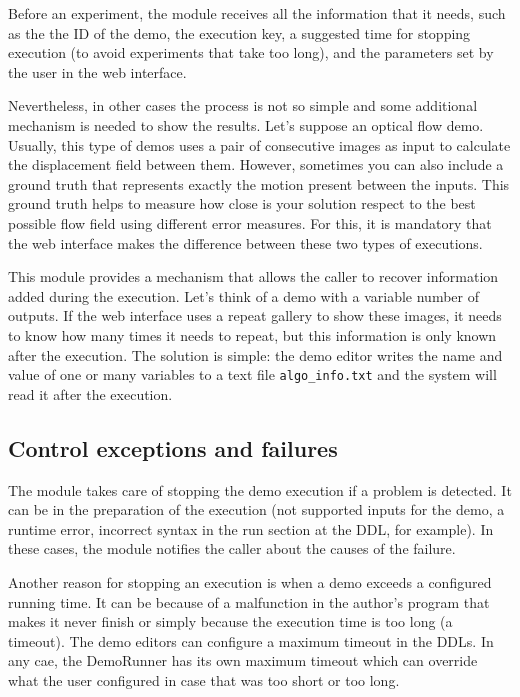 Before an experiment, the module receives all the information that it needs, such as the the ID of the demo, the execution key, a suggested time for stopping execution (to avoid experiments that take too long), and the parameters set by the user in the web interface.

Nevertheless, in other cases the process is not so simple and some additional mechanism is needed to show the results.  Let's suppose an optical flow demo. Usually, this type of demos uses a pair of consecutive images as input to calculate the displacement field between them. However, sometimes you can also include a ground truth that represents exactly the motion present between the inputs. This ground truth helps to measure how close is your solution respect to the best possible flow field using different error measures. For this, it is mandatory that the web interface makes the difference between these two types of executions. 


This module provides a mechanism that allows the caller to recover information added during the execution. Let's think of a demo with a variable number of outputs. If the web interface uses a repeat gallery to show these images, it needs to know how many times it needs to repeat, but this information is only known after the execution. The solution is simple: the demo editor writes the name and value of one or many variables to a text file {\tt algo\_info.txt} and the system will read it after the execution.


\subsection{Control exceptions and failures}
\noindent

The module takes care of stopping the demo execution if a problem is detected. It can be in the preparation of the execution (not supported inputs for the demo, a runtime error, incorrect syntax in the run section at the DDL, for example). In these cases, the module notifies the caller about the causes of the failure.

Another reason for stopping an execution is when a demo exceeds a configured running time. It can be because of a malfunction in the author's program that makes it never finish or simply because the execution time is too long (a timeout). The demo editors can configure a maximum timeout in the DDLs. In any cae, the DemoRunner has its own maximum timeout which can override what the user configured in case that was too short or too long.
